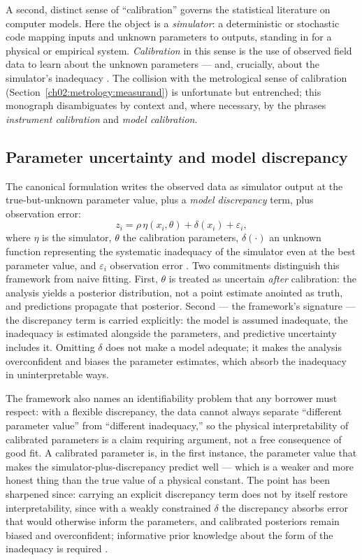 A second, distinct sense of ``calibration'' governs the statistical literature on computer models. Here the object is a \emph{simulator}: a deterministic or stochastic code mapping inputs and unknown parameters to outputs, standing in for a physical or empirical system. \emph{Calibration} in this sense is the use of observed field data to learn about the unknown parameters --- and, crucially, about the simulator's inadequacy \cite{kennedyohagan}. The collision with the metrological sense of calibration (Section~\ref{ch02:metrology:measurand}) is unfortunate but entrenched; this monograph disambiguates by context and, where necessary, by the phrases \emph{instrument calibration} and \emph{model calibration}.

\subsection{Parameter uncertainty and model discrepancy}\label{ch02:calibration:kernel}

The canonical formulation writes the observed data as simulator output at the true-but-unknown parameter value, plus a \emph{model discrepancy} term, plus observation error:
\[
z_i = \rho\,\eta(x_i, \theta) + \delta(x_i) + \varepsilon_i,
\]
where $\eta$ is the simulator, $\theta$ the calibration parameters, $\delta(\cdot)$ an unknown function representing the systematic inadequacy of the simulator even at the best parameter value, and $\varepsilon_i$ observation error \cite{kennedyohagan}. Two commitments distinguish this framework from naive fitting. First, $\theta$ is treated as uncertain \emph{after} calibration: the analysis yields a posterior distribution, not a point estimate anointed as truth, and predictions propagate that posterior. Second --- the framework's signature --- the discrepancy term is carried explicitly: the model is assumed inadequate, the inadequacy is estimated alongside the parameters, and predictive uncertainty includes it. Omitting $\delta$ does not make a model adequate; it makes the analysis overconfident and biases the parameter estimates, which absorb the inadequacy in uninterpretable ways.

The framework also names an identifiability problem that any borrower must respect: with a flexible discrepancy, the data cannot always separate ``different parameter value'' from ``different inadequacy,'' so the physical interpretability of calibrated parameters is a claim requiring argument, not a free consequence of good fit. A calibrated parameter is, in the first instance, the parameter value that makes the simulator-plus-discrepancy predict well --- which is a weaker and more honest thing than the true value of a physical constant. The point has been sharpened since: carrying an explicit discrepancy term does not by itself restore interpretability, since with a weakly constrained $\delta$ the discrepancy absorbs error that would otherwise inform the parameters, and calibrated posteriors remain biased and overconfident; informative prior knowledge about the form of the inadequacy is required \cite{brynjarsdottir}.

